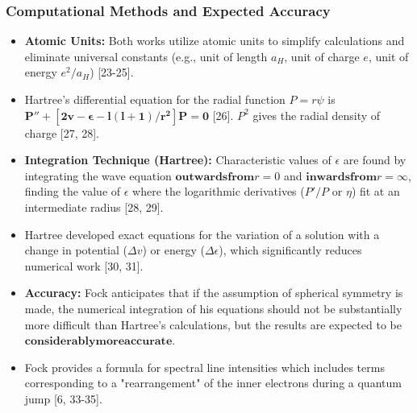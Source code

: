 \begin{frame}
    \frametitle{Computational Methods and Expected Accuracy}
    \begin{itemize}
        \item \textbf{Atomic Units:} Both works utilize atomic units to simplify calculations and eliminate universal constants (e.g., unit of length $a_H$, unit of charge $e$, unit of energy $e^2/a_H$) [23-25].
        \item Hartree's differential equation for the radial function $P=r\psi$ is $\mathbf{P'' + [2v - \epsilon - l(l+1)/r^2]P = 0}$ [26]. $P^2$ gives the radial density of charge [27, 28].
        \item \textbf{Integration Technique (Hartree):} Characteristic values of $\epsilon$ are found by integrating the wave equation $\mathbf{outwards from} r=0$ and $\mathbf{inwards from} r=\infty$, finding the value of $\epsilon$ where the logarithmic derivatives ($P'/P$ or $\eta$) fit at an intermediate radius [28, 29].
        \item Hartree developed exact equations for the variation of a solution with a change in potential ($\Delta v$) or energy ($\Delta \epsilon$), which significantly reduces numerical work [30, 31].
        \item \textbf{Accuracy:} Fock anticipates that if the assumption of spherical symmetry is made, the numerical integration of his equations should not be substantially more difficult than Hartree's calculations, but the results are expected to be $\mathbf{considerably more accurate}$.
        \item Fock provides a formula for spectral line intensities which includes terms corresponding to a "rearrangement" of the inner electrons during a quantum jump [6, 33-35].
    \end{itemize}
\end{frame}

